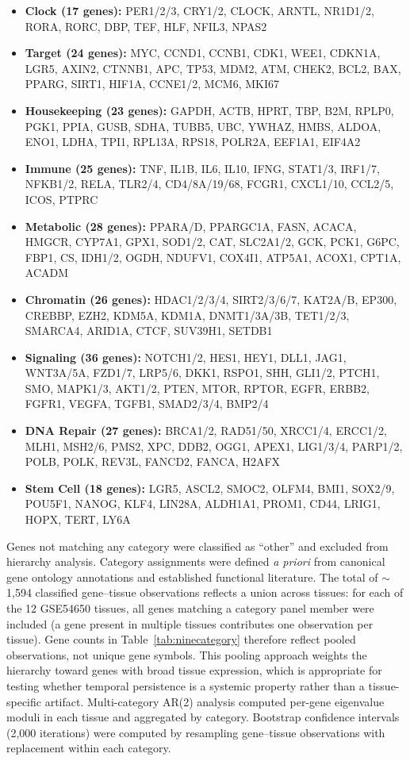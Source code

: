 \documentclass[11pt,letterpaper]{article}
\begin{document}
\begin{itemize}[noitemsep]
    \item \textbf{Clock (17 genes):} PER1/2/3, CRY1/2, CLOCK, ARNTL, NR1D1/2, RORA, RORC, DBP, TEF, HLF, NFIL3, NPAS2
    \item \textbf{Target (24 genes):} MYC, CCND1, CCNB1, CDK1, WEE1, CDKN1A, LGR5, AXIN2, CTNNB1, APC, TP53, MDM2, ATM, CHEK2, BCL2, BAX, PPARG, SIRT1, HIF1A, CCNE1/2, MCM6, MKI67
    \item \textbf{Housekeeping (23 genes):} GAPDH, ACTB, HPRT, TBP, B2M, RPLP0, PGK1, PPIA, GUSB, SDHA, TUBB5, UBC, YWHAZ, HMBS, ALDOA, ENO1, LDHA, TPI1, RPL13A, RPS18, POLR2A, EEF1A1, EIF4A2
    \item \textbf{Immune (25 genes):} TNF, IL1B, IL6, IL10, IFNG, STAT1/3, IRF1/7, NFKB1/2, RELA, TLR2/4, CD4/8A/19/68, FCGR1, CXCL1/10, CCL2/5, ICOS, PTPRC
    \item \textbf{Metabolic (28 genes):} PPARA/D, PPARGC1A, FASN, ACACA, HMGCR, CYP7A1, GPX1, SOD1/2, CAT, SLC2A1/2, GCK, PCK1, G6PC, FBP1, CS, IDH1/2, OGDH, NDUFV1, COX4I1, ATP5A1, ACOX1, CPT1A, ACADM
    \item \textbf{Chromatin (26 genes):} HDAC1/2/3/4, SIRT2/3/6/7, KAT2A/B, EP300, CREBBP, EZH2, KDM5A, KDM1A, DNMT1/3A/3B, TET1/2/3, SMARCA4, ARID1A, CTCF, SUV39H1, SETDB1
    \item \textbf{Signaling (36 genes):} NOTCH1/2, HES1, HEY1, DLL1, JAG1, WNT3A/5A, FZD1/7, LRP5/6, DKK1, RSPO1, SHH, GLI1/2, PTCH1, SMO, MAPK1/3, AKT1/2, PTEN, MTOR, RPTOR, EGFR, ERBB2, FGFR1, VEGFA, TGFB1, SMAD2/3/4, BMP2/4
    \item \textbf{DNA Repair (27 genes):} BRCA1/2, RAD51/50, XRCC1/4, ERCC1/2, MLH1, MSH2/6, PMS2, XPC, DDB2, OGG1, APEX1, LIG1/3/4, PARP1/2, POLB, POLK, REV3L, FANCD2, FANCA, H2AFX
    \item \textbf{Stem Cell (18 genes):} LGR5, ASCL2, SMOC2, OLFM4, BMI1, SOX2/9, POU5F1, NANOG, KLF4, LIN28A, ALDH1A1, PROM1, CD44, LRIG1, HOPX, TERT, LY6A
\end{itemize}

Genes not matching any category were classified as ``other'' and excluded from hierarchy analysis. Category assignments were defined \textit{a priori} from canonical gene ontology annotations and established functional literature. The total of $\sim$1,594 classified gene--tissue observations reflects a union across tissues: for each of the 12 GSE54650 tissues, all genes matching a category panel member were included (a gene present in multiple tissues contributes one observation per tissue). Gene counts in Table~\ref{tab:ninecategory} therefore reflect pooled observations, not unique gene symbols. This pooling approach weights the hierarchy toward genes with broad tissue expression, which is appropriate for testing whether temporal persistence is a systemic property rather than a tissue-specific artifact. Multi-category AR(2) analysis computed per-gene eigenvalue moduli in each tissue and aggregated by category. Bootstrap confidence intervals (2,000 iterations) were computed by resampling gene--tissue observations with replacement within each category.
\end{document}
